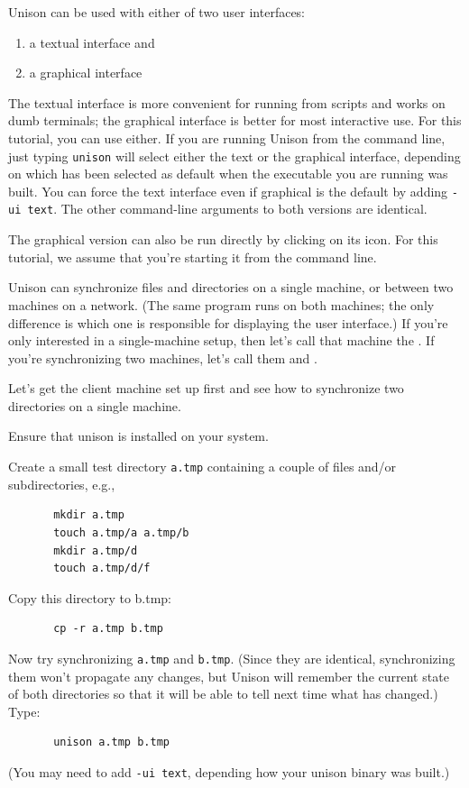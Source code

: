 \documentclass{article}
\begin{document}
Unison can be used with either of two user interfaces:
\begin{enumerate}
\item a textual interface and
\item a graphical interface
\end{enumerate}
The textual interface is more convenient for running from scripts and
works on dumb terminals; the graphical interface is better for most
interactive use.  For this tutorial, you can use either.  If you are running
Unison from the command line, just typing {\tt unison}
will select either the text or the graphical interface, depending on which
has been selected as default when the executable you are running was
built.  You can force the text interface even if graphical is the default by
adding {\tt -ui text}.
The other command-line arguments to both versions are identical.

The graphical version can also be run directly by clicking on its
icon.
For this tutorial, we assume that you're starting it from the command
line.

Unison can synchronize files and directories on a single machine, or
between two machines on a network.  (The same program runs on both
machines; the only difference is which one is responsible for
displaying the user interface.)  If you're only interested in a
single-machine setup, then let's call that machine the \CLIENT{}.  If
you're synchronizing two machines, let's call them \CLIENT{} and
\SERVER.


Let's get the client machine set up first and see how to synchronize
two directories on a single machine.

Ensure that unison is installed on your system.

Create a small test directory {\tt a.tmp} containing a couple of files
and/or subdirectories, e.g.,
\begin{verbatim}
       mkdir a.tmp
       touch a.tmp/a a.tmp/b
       mkdir a.tmp/d
       touch a.tmp/d/f
\end{verbatim}
Copy this directory to b.tmp:
\begin{verbatim}
       cp -r a.tmp b.tmp
\end{verbatim}

Now try synchronizing {\tt a.tmp} and {\tt b.tmp}.  (Since they are
identical, synchronizing them won't propagate any changes, but Unison
will remember the current state of both directories so that it will be
able to tell next time what has changed.)  Type:
\begin{verbatim}
       unison a.tmp b.tmp
\end{verbatim}
(You may need to add \verb|-ui text|, depending how your unison binary was built.)
\end{document}
